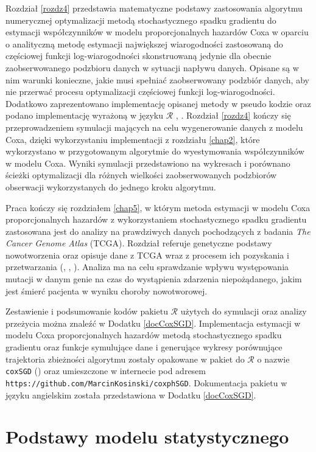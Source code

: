Rozdział \ref{rozdz4} przedstawia matematyczne podstawy zastosowania algorytmu numerycznej optymalizacji metodą stochastycznego spadku gradientu do estymacji współczynników w modelu proporcjonalnych hazardów Coxa w oparciu o analityczną metodę estymacji największej wiarogodności zastosowaną do częściowej funkcji log-wiarogodności skonstruowaną jedynie dla obecnie zaobserwowanego podzbioru danych w sytuacji napływu danych. Opisane są w nim warunki konieczne, jakie musi spełniać zaobserwowany podzbiór danych, aby nie przerwać procesu optymalizacji częściowej funkcji log-wiarogodności. Dodatkowo zaprezentowano implementację opisanej metody w pseudo kodzie oraz podano implementację wyrażoną w języku $\mathcal{R}$ \cite{programikr}, \cite{biecek1}. Rozdział \ref{rozdz4} kończy się przeprowadzeniem symulacji mających na celu wygenerowanie danych z modelu Coxa, dzięki wykorzystaniu implementacji z rozdziału \ref{chap2}, które wykorzystano w przygotowanym algorytmie do wyestymowania współczynników w modelu Coxa. Wyniki symulacji przedstawiono na wykresach i porównano ścieżki optymalizacji dla różnych wielkości zaobserwowanych podzbiorów obserwacji wykorzystanych do jednego kroku algorytmu. 

Praca kończy się rozdziałem \ref{chap5}, w którym metoda estymacji w modelu Coxa proporcjonalnych hazardów z wykorzystaniem stochastycznego spadku gradientu zastosowana jest do analizy na prawdziwych danych pochodzących z badania \textit{The Cancer Genome Atlas} (TCGA). Rozdział referuje genetyczne podstawy nowotworzenia oraz opisuje dane z TCGA wraz z procesem ich pozyskania i przetwarzania (\cite{kosa1}, \cite{kosa2}, \cite{kosa3}). Analiza ma na celu sprawdzanie wpływu występowania mutacji w danym genie na czas do wystąpienia zdarzenia niepożądanego, jakim jest śmierć pacjenta w wyniku choroby nowotworowej.

Zestawienie i podsumowanie kodów pakietu $\mathcal{R}$ użytych do symulacji oraz analizy przeżycia można znaleźć w Dodatku \ref{docCoxSGD}. Implementacja estymacji w modelu Coxa proporcjonalnych hazardów metodą stochastycznego spadku gradientu oraz funkcje symulujące dane i generujące wykresy porównujące trajektoria zbieżności algorytmu zostały opakowane w pakiet do $\mathcal{R}$ o nazwie \texttt{coxSGD} (\cite{kosa0}) oraz umieszczone w internecie pod adresem \texttt{https://github.com/MarcinKosinski/coxphSGD}. Dokumentacja pakietu w języku angielskim została przedstawiona w Dodatku \ref{docCoxSGD}.

\chapter*{Podstawy modelu statystycznego}

